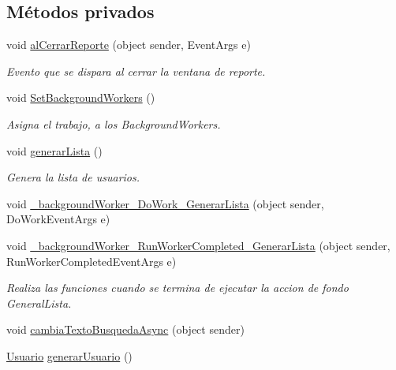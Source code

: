 \subsection*{Métodos privados}
\begin{DoxyCompactItemize}
\item 
void \hyperlink{class_proyecto___integrador__3_1_1_main_window_a49f98bf3443dff4b67a632a88876c5ea}{al\-Cerrar\-Reporte} (object sender, Event\-Args e)
\begin{DoxyCompactList}\small\item\em Evento que se dispara al cerrar la ventana de reporte. \end{DoxyCompactList}\item 
void \hyperlink{class_proyecto___integrador__3_1_1_main_window_a1d3507f367b67fc0d78b419104022d8b}{Set\-Background\-Workers} ()
\begin{DoxyCompactList}\small\item\em Asigna el trabajo, a los Background\-Workers. \end{DoxyCompactList}\item 
void \hyperlink{class_proyecto___integrador__3_1_1_main_window_a524b3904582404e525a70f8ceac96e7d}{generar\-Lista} ()
\begin{DoxyCompactList}\small\item\em Genera la lista de usuarios. \end{DoxyCompactList}\item 
void \hyperlink{class_proyecto___integrador__3_1_1_main_window_ab249799e7bcd0f69fb202e5d0cdf130f}{\-\_\-background\-Worker\-\_\-\-Do\-Work\-\_\-\-Generar\-Lista} (object sender, Do\-Work\-Event\-Args e)
\item 
void \hyperlink{class_proyecto___integrador__3_1_1_main_window_a1199d4e141bb0903e06b0d32afe5e00b}{\-\_\-background\-Worker\-\_\-\-Run\-Worker\-Completed\-\_\-\-Generar\-Lista} (object sender, Run\-Worker\-Completed\-Event\-Args e)
\begin{DoxyCompactList}\small\item\em Realiza las funciones cuando se termina de ejecutar la accion de fondo General\-Lista. \end{DoxyCompactList}\item 
void \hyperlink{class_proyecto___integrador__3_1_1_main_window_ab610c382bc2fb0c9dff1bbb26684a526}{cambia\-Texto\-Busqueda\-Async} (object sender)
\item 
\hyperlink{class_proyecto___integrador__3_1_1_tipos_dato_1_1_usuario}{Usuario} \hyperlink{class_proyecto___integrador__3_1_1_main_window_ab40c61d0760b2a0dc07afd9fb565783e}{generar\-Usuario} ()

\end{DoxyCompactItemize}
